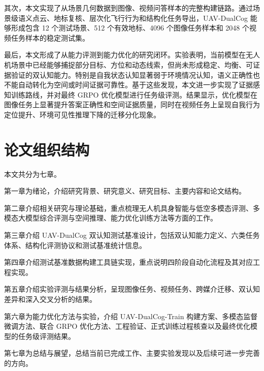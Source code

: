 其次，本文实现了从场景几何数据到图像、视频问答样本的完整构建链路。通过场景级语义点云、地标复核、层次化飞行行为和结构化任务导出，UAV-DualCog 能够形成包含 12 个测试场景、512 个有效地标、4096 个图像任务样本和 2048 个视频任务样本的稳定测试集。

最后，本文形成了从能力评测到能力优化的研究闭环。实验表明，当前模型在无人机场景中已经能够捕捉部分目标、方位和动态线索，但尚未形成稳定、均衡、可证据验证的双认知能力。特别是自我状态认知显著弱于环境情况认知，语义正确性也不能自动转化为空间或时间证据可靠性。基于这些发现，本文进一步实现了证据感知训练路线，并对最终 GRPO 优化模型进行任务级评测。结果显示，优化模型在图像任务上显著提升答案正确性和空间证据质量，同时在视频任务上呈现自我行为定位提升、环境可见性推理下降的迁移分化现象。

\section{论文组织结构}

本文共分为七章。

第一章为绪论，介绍研究背景、研究意义、研究目标、主要内容和论文结构。

第二章介绍相关研究与理论基础，重点梳理无人机具身智能与低空多模态评测、多模态大模型综合评测与空间推理、能力优化训练方法等方面的工作。

第三章介绍 UAV-DualCog 双认知测试基准设计，包括双认知能力定义、六类任务体系、结构化评测协议和测试基准统计信息。

第四章介绍测试基准数据构建工具链实现，重点说明四阶段自动化流程及其对应工程实现。

第五章介绍实验评测与结果分析，呈现图像任务、视频任务、跨媒介迁移、双认知差异和深入交叉分析的结果。

第六章为能力优化方法与实验，介绍 UAV-DualCog-Train 构建方案、多模态监督微调方法、联合 GRPO 优化方法、工程验证、正式训练过程核查以及最终优化模型的任务级评测结果。

第七章为总结与展望，总结当前已完成工作、主要实验发现以及后续可进一步完善的方向。
